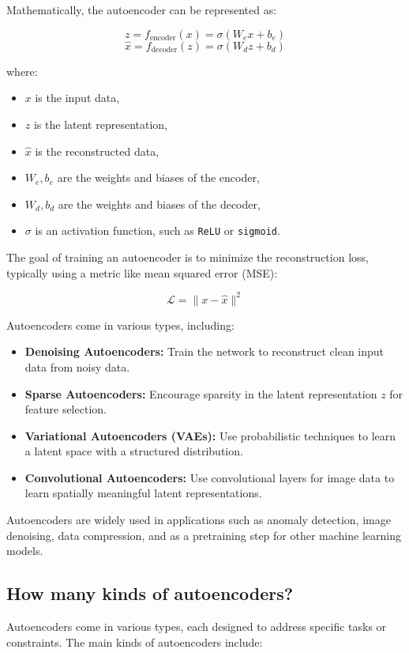 Mathematically, the autoencoder can be represented as:

\[
z = f_{\text{encoder}}(x) = \sigma(W_e x + b_e)
\]
\[
\hat{x} = f_{\text{decoder}}(z) = \sigma(W_d z + b_d)
\]

where:
\begin{itemize}
    \item \( x \) is the input data,
    \item \( z \) is the latent representation,
    \item \( \hat{x} \) is the reconstructed data,
    \item \( W_e, b_e \) are the weights and biases of the encoder,
    \item \( W_d, b_d \) are the weights and biases of the decoder,
    \item \( \sigma \) is an activation function, such as \texttt{ReLU} or \texttt{sigmoid}.
\end{itemize}

The goal of training an autoencoder is to minimize the reconstruction loss, typically using a metric like mean squared error (MSE):

\[
\mathcal{L} = \| x - \hat{x} \|^2
\]

Autoencoders come in various types, including:
\begin{itemize}
    \item \textbf{Denoising Autoencoders:} Train the network to reconstruct clean input data from noisy data.
    \item \textbf{Sparse Autoencoders:} Encourage sparsity in the latent representation \( z \) for feature selection.
    \item \textbf{Variational Autoencoders (VAEs):} Use probabilistic techniques to learn a latent space with a structured distribution.
    \item \textbf{Convolutional Autoencoders:} Use convolutional layers for image data to learn spatially meaningful latent representations.
\end{itemize}

Autoencoders are widely used in applications such as anomaly detection, image denoising, data compression, and as a pretraining step for other machine learning models.

\subsection{How many kinds of autoencoders?}

Autoencoders come in various types, each designed to address specific tasks or constraints. The main kinds of autoencoders include:


